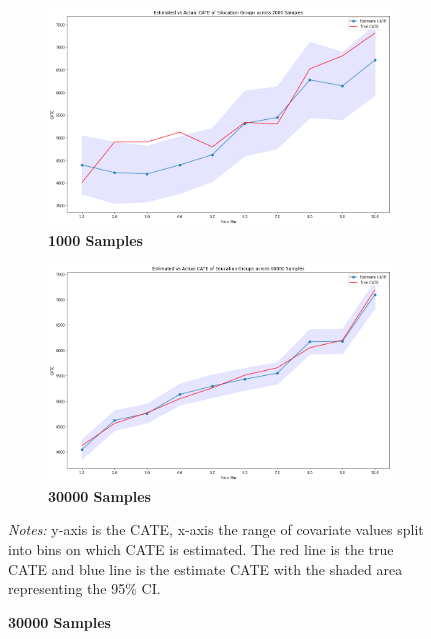 \documentclass[12pt]{article}
\begin{document}
\begin{figure}[!htp]
\caption{\label{figure:five}Estimated vs. Actual CATE across Education Level}
	\centering
	\begin{subfigure} [h] {0.49\linewidth}
		\caption{\textbf{1000 Samples}}
   	 	\includegraphics[width = \linewidth]{Graphs/s2_educ2000.png}
	\end{subfigure}
	\begin{subfigure} [h] {0.49\linewidth}
		\caption{\textbf{30000 Samples}}
   	 	\includegraphics[width = \linewidth]{Graphs/s2_educ60000.png}
	\end{subfigure}
\footnotesize
\emph{Notes:}  y-axis is the CATE, x-axis the range of covariate values split into bins on which CATE is estimated. The red line is the true CATE and blue line is the estimate CATE with the shaded area representing the 95\% CI.
\end{figure} 
\end{document}
